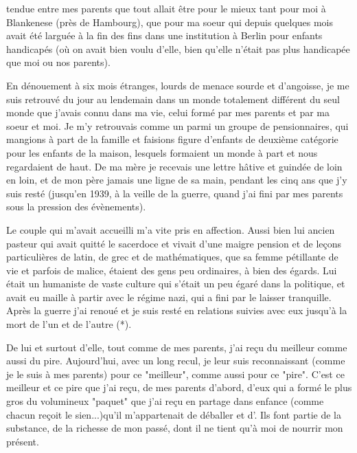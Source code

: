 

tendue entre mes parents que tout allait être pour le mieux tant pour moi à Blankenese (près de Hambourg), que pour ma soeur qui depuis quelques mois avait été larguée à la fin des fins dans une institution à Berlin pour enfants handicapés (où on avait bien voulu d'elle, bien qu'elle n'était pas plus handicapée que moi ou nos parents).

En dénouement à six mois étranges, lourds de menace sourde et d'angoisse, je me suis retrouvé du jour au lendemain dans un monde totalement différent du seul monde que j'avais connu dans ma vie, celui formé par mes parents et par ma soeur et moi. Je m'y retrouvais comme un parmi un groupe de pensionnaires, qui mangions à part de la famille et faisions figure d'enfants de deuxième catégorie pour les enfants de la maison, lesquels formaient un monde à part et nous regardaient de haut. De ma mère je recevais une lettre hâtive et guindée de loin en loin, et de mon père jamais une ligne de sa main, pendant les cinq ans que j'y suis resté (jusqu'en 1939, à la veille de la guerre, quand j'ai fini par  mes parents sous la pression des évènements).

Le couple qui m'avait accueilli m'a vite pris en affection. Aussi bien lui ancien pasteur qui avait quitté le sacerdoce et vivait d'une maigre pension et de leçons particulières de latin, de grec et de mathématiques, que sa femme pétillante de vie et parfois de malice, étaient des gens peu ordinaires,  à bien des égards. Lui était un humaniste de vaste culture qui s'était un peu égaré dans la politique, et avait eu maille à partir avec le régime nazi, qui a fini par le laisser tranquille. Après la guerre j'ai renoué et je suis resté en relations suivies avec eux jusqu'à la mort de l'un et de l'autre (*).

De lui et surtout d'elle, tout comme de mes parents, j'ai reçu du meilleur comme aussi du pire. Aujourd'hui, avec un long recul, je leur suis reconnaissant (comme je le suis à mes parents) pour ce "meilleur", comme aussi pour ce "pire". C'est ce meilleur et ce pire que j'ai reçu, de mes parents d'abord, d'eux  qui a formé le plus gros du volumineux "paquet" que j'ai reçu en partage dans  enfance (comme chacun reçoit le sien...)\handwritten{\unsure{,}}\unsure{,}qu'il m'appartenait de déballer et d'. Ils font partie de la substance, de la richesse de mon passé, dont il ne tient qu'à moi de nourrir mon présent.

